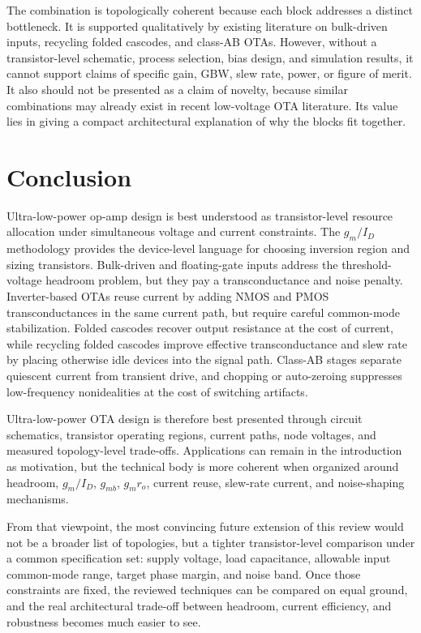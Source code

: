 \documentclass[conference,a4paper]{IEEEtran}
\begin{document}
The combination is topologically coherent because each block addresses a distinct bottleneck. It is supported qualitatively by existing literature on bulk-driven inputs, recycling folded cascodes, and class-AB OTAs. However, without a transistor-level schematic, process selection, bias design, and simulation results, it cannot support claims of specific gain, GBW, slew rate, power, or figure of merit. It also should not be presented as a claim of novelty, because similar combinations may already exist in recent low-voltage OTA literature. Its value lies in giving a compact architectural explanation of why the blocks fit together.

\section{Conclusion}
Ultra-low-power op-amp design is best understood as transistor-level resource allocation under simultaneous voltage and current constraints. The $g_m/I_D$ methodology provides the device-level language for choosing inversion region and sizing transistors. Bulk-driven and floating-gate inputs address the threshold-voltage headroom problem, but they pay a transconductance and noise penalty. Inverter-based OTAs reuse current by adding NMOS and PMOS transconductances in the same current path, but require careful common-mode stabilization. Folded cascodes recover output resistance at the cost of current, while recycling folded cascodes improve effective transconductance and slew rate by placing otherwise idle devices into the signal path. Class-AB stages separate quiescent current from transient drive, and chopping or auto-zeroing suppresses low-frequency nonidealities at the cost of switching artifacts.

Ultra-low-power OTA design is therefore best presented through circuit schematics, transistor operating regions, current paths, node voltages, and measured topology-level trade-offs. Applications can remain in the introduction as motivation, but the technical body is more coherent when organized around headroom, $g_m/I_D$, $g_{mb}$, $g_mr_o$, current reuse, slew-rate current, and noise-shaping mechanisms.

From that viewpoint, the most convincing future extension of this review would not be a broader list of topologies, but a tighter transistor-level comparison under a common specification set: supply voltage, load capacitance, allowable input common-mode range, target phase margin, and noise band. Once those constraints are fixed, the reviewed techniques can be compared on equal ground, and the real architectural trade-off between headroom, current efficiency, and robustness becomes much easier to see.



\end{document}
